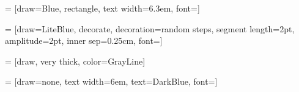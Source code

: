 


 = [draw=Blue, 
                    rectangle, 
                    text width=6.3em, 
                    font=\scriptsize]

 = [draw=LiteBlue, 
                       decorate,
                       decoration={random steps,
                                   segment length=2pt,
                                   amplitude=2pt},
                       inner sep=0.25cm, 
                       font=\scriptsize]
                    
 = [draw,
                        very thick,
                        color=GrayLine]
                        
 = [draw=none, 
                          text width=6em,
                          text=DarkBlue,
                          font=\small]

